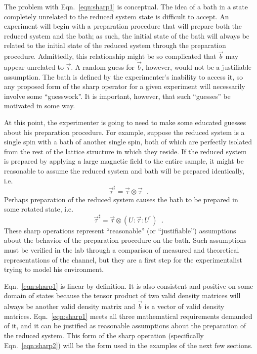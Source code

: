 The problem with Eqn.\ \ref{eqn:sharp1} is conceptual.  The idea of a bath in a state completely unrelated to the reduced system state is difficult to accept.  An experiment will begin with a preparation procedure that will prepare both the reduced system and the bath; as such, the initial state of the bath will always be related to the initial state of the reduced system through the preparation procedure.  Admittedly, this relationship might be so complicated that $\vec{b}$ may appear unrelated to $\vec{\tau}$.  A random guess for $\vec{b}$, however, would not be a justifiable assumption.  The bath is defined by the experimenter's inability to access it, so any proposed form of the sharp operator for a given experiment will necessarily involve some ``guesswork''.  It is important, however, that such ``guesses'' be motivated in some way.  

At this point, the experimenter is going to need to make some educated guesses about his preparation procedure.  For example, suppose the reduced system is a single spin with a bath of another single spin, both of which are perfectly isolated from the rest of the lattice structure in which they reside.  If the reduced system is prepared by applying a large magnetic field to the entire sample, it might be reasonable to assume the reduced system and bath will be prepared identically, i.e.\
$$
\vec{\tau}^\sharp = \vec{\tau}\otimes\vec{\tau}\;\;.
$$
Perhaps preparation of the reduced system causes the bath to be prepared in some rotated state, i.e.\
\begin{equation}
\label{eqn:sharp2}
\vec{\tau}^\sharp = \vec{\tau}\otimes \left(U:\vec{\tau}:U^\dagger\right)\;\;.
\end{equation}
These sharp operations represent ``reasonable'' (or ``justifiable'') assumptions about the behavior of the preparation procedure on the bath.  Such assumptions must be verified in the lab through a comparison of measured and theoretical representations of the channel, but they are a first step for the experimentalist trying to model his environment.

Eqn.\ \ref{eqn:sharp1} is linear by definition.  It is also consistent and positive on some domain of states because the tensor product of two valid density matrices will always be another valid density matrix and $\vec{b}$ is a vector of valid density matrices.  Eqn.\ \ref{eqn:sharp1} meets all three mathematical requirements demanded of it, and it can be justified as reasonable assumptions about the preparation of the reduced system.  This form of the sharp operation (specifically Eqn.\ \ref{eqn:sharp2}) will be the form used in the examples of the next few sections.  

